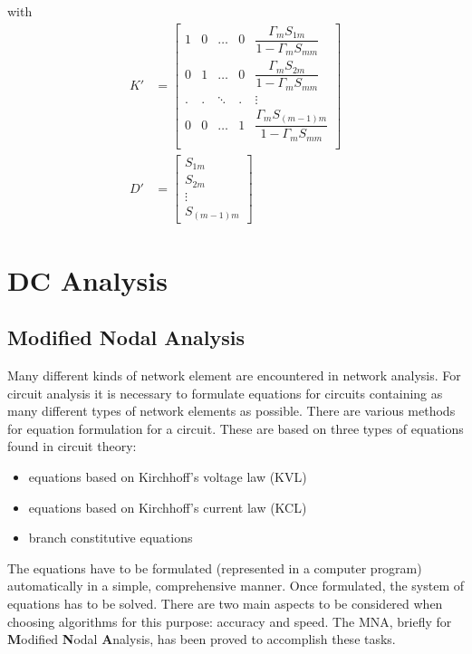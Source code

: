 \documentclass[10pt]{report}
\begin{document}
with
\begin{align}
K' &=
\begin{bmatrix}
1 & 0 & \ldots & 0 & \dfrac{\Gamma_m S_{1m}}{1 - \Gamma_m S_{mm}}\\
0 & 1 & \ldots & 0 & \dfrac{\Gamma_m S_{2m}}{1 - \Gamma_m S_{mm}}\\
. & . & \ddots & . & \vdots\\
0 & 0 & \ldots & 1 & \dfrac{\Gamma_m S_{(m-1)m}}{1 - \Gamma_m S_{mm}}\\
\end{bmatrix}\\
D' &=
\begin{bmatrix}
S_{1m}\\
S_{2m}\\
\vdots\\
S_{(m-1)m}
\end{bmatrix}
\end{align}

\chapter{DC Analysis}

\section{Modified Nodal Analysis}
\label{sec:MNA}

Many different kinds of network element are encountered in network
analysis.  For circuit analysis it is necessary to formulate equations
for circuits containing as many different types of network elements as
possible.  There are various methods for equation formulation for a
circuit.  These are based on three types of equations found in circuit
theory:

\begin{itemize}
\item equations based on Kirchhoff's voltage law (KVL)
\item equations based on Kirchhoff's current law (KCL)
\item branch constitutive equations
\end{itemize}

The equations have to be formulated (represented in a computer
program) automatically in a simple, comprehensive manner.  Once
formulated, the system of equations has to be solved.  There are two
main aspects to be considered when choosing algorithms for this
purpose: accuracy and speed.  The MNA, briefly for \textbf{M}odified
\textbf{N}odal \textbf{A}nalysis, has been proved to accomplish these
tasks.
\end{document}
